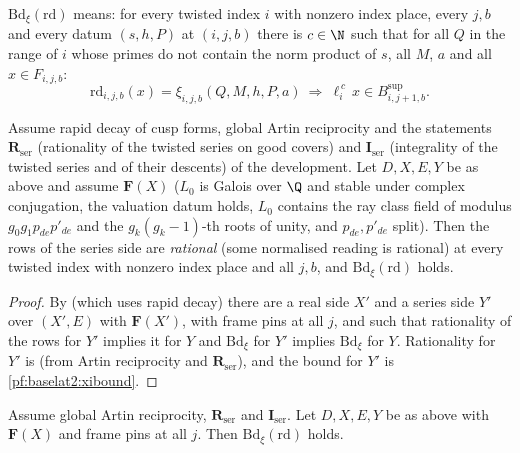 \begin{definition}\label{pf:baselat2:xibdd}
$\mathrm{Bd}_{\xi}(\mathrm{rd})$ means: for every twisted index $i$ with nonzero index place, every $j,b$ and every datum
$(s,h,P)$ at $(i,j,b)$ there is $c\in\N$ such that for all $Q$ in the range of $i$ whose primes do not
contain the norm product of $s$, all $M$, $a$ and all $x\in F_{i,j,b}$:
\[
  \mathrm{rd}_{i,j,b}(x)=\xi_{i,j,b}(Q,M,h,P,a)\ \Longrightarrow\ \ell_i^{\,c}\,x\in B^{\sup}_{i,j+1,b}.
\]
\end{definition}

\begin{theorem}\label{pf:baselat2:thetarat}
Assume rapid decay of cusp forms, global Artin reciprocity and the statements $\mathbf{R}_{\mathrm{ser}}$ (rationality
of the twisted series on good covers) and $\mathbf{I}_{\mathrm{ser}}$ (integrality of the twisted series and of their
descents) of the development. Let $D,X,E,Y$ be as above and assume $\mathbf{F}(X)$ ($L_0$ is Galois over
$\Q$ and stable under complex conjugation, the valuation datum holds, $L_0$ contains the ray class field of
modulus $g_0g_1p_{de}p'_{de}$ and the $g_k(g_k-1)$-th roots of unity, and $p_{de},p'_{de}$ split). Then the
rows of the series side are \emph{rational} (some normalised reading is rational) at every
twisted index with nonzero index place and all $j,b$, and $\mathrm{Bd}_{\xi}(\mathrm{rd})$ holds.
\end{theorem}

\begin{proof}
By  (which uses rapid decay) there are a real side $X'$ and a
series side $Y'$ over $(X',E)$ with $\mathbf{F}(X')$, with frame pins at all $j$, and such that
rationality of the rows for $Y'$ implies it for $Y$ and $\mathrm{Bd}_{\xi}$ for $Y'$ implies $\mathrm{Bd}_{\xi}$ for
$Y$. Rationality for $Y'$ is 
(from Artin reciprocity and $\mathbf{R}_{\mathrm{ser}}$), and the bound for $Y'$ is \cref{pf:baselat2:xibound}.
\end{proof}

\begin{theorem}\label{pf:baselat2:xibound}
Assume global Artin reciprocity, $\mathbf{R}_{\mathrm{ser}}$ and $\mathbf{I}_{\mathrm{ser}}$. Let $D,X,E,Y$ be as above with
$\mathbf{F}(X)$ and frame pins at all $j$. Then $\mathrm{Bd}_{\xi}(\mathrm{rd})$ holds.
\end{theorem}

